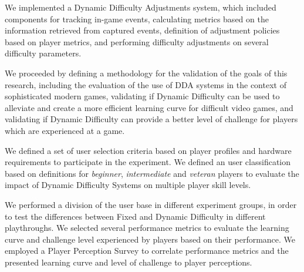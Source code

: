 We implemented a Dynamic Difficulty Adjustments system, which included components for tracking in-game events, calculating metrics based on the information retrieved from captured events, definition of adjustment policies based on player metrics, and performing difficulty adjustments on several difficulty parameters.

We proceeded by defining a methodology for the validation of the goals of this research, including the evaluation of the use of DDA systems in the context of sophisticated modern games, validating if Dynamic Difficulty can be used to alleviate and create a more efficient learning curve for difficult video games, and validating if Dynamic Difficulty can provide a better level of challenge for players which are experienced at a game.

We defined a set of user selection criteria based on player profiles and hardware requirements to participate in the experiment. We defined an user classification based on definitions for \emph{beginner}, \emph{intermediate} and \emph{veteran} players to evaluate the impact of Dynamic Difficulty Systems on multiple player skill levels.

We performed a division of the user base in different experiment groups, in order to test the differences between Fixed and Dynamic Difficulty in different playthroughs. We selected several performance metrics to evaluate the learning curve and challenge level experienced by players based on their performance. We employed a Player Perception Survey to correlate performance metrics and the presented learning curve and level of challenge to player perceptions.

